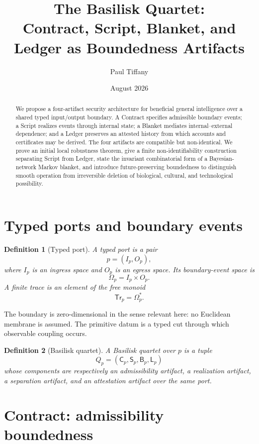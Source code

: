 \documentclass[11pt]{article}
\title{The Basilisk Quartet:\\Contract, Script, Blanket, and Ledger as Boundedness Artifacts}
\author{Paul Tiffany}
\date{August 2026}
\newtheorem{definition}{Definition}[section]
\newcommand{\Contract}{\mathsf{C}}
\newcommand{\Script}{\mathsf{S}}
\newcommand{\Blanket}{\mathsf{B}}
\newcommand{\Ledger}{\mathsf{L}}
\newcommand{\Tr}{\mathsf{Tr}}
\begin{document}
\maketitle

\begin{abstract}
We propose a four-artifact security architecture for beneficial general intelligence over a shared typed input/output boundary. A Contract specifies admissible boundary events; a Script realizes events through internal state; a Blanket mediates internal--external dependence; and a Ledger preserves an attested history from which accounts and certificates may be derived. The four artifacts are compatible but non-identical. We prove an initial local robustness theorem, give a finite non-identifiability construction separating Script from Ledger, state the invariant combinatorial form of a Bayesian-network Markov blanket, and introduce future-preserving boundedness to distinguish smooth operation from irreversible deletion of biological, cultural, and technological possibility.
\end{abstract}

\section{Typed ports and boundary events}

\begin{definition}[Typed port]
A typed port is a pair
\[
p=(I_p,O_p),
\]
where $I_p$ is an ingress space and $O_p$ is an egress space. Its boundary-event space is
\[
\Omega_p=I_p\times O_p.
\]
A finite trace is an element of the free monoid
\[
\Tr_p=\Omega_p^*.
\]
\end{definition}

The boundary is zero-dimensional in the sense relevant here: no Euclidean membrane is assumed. The primitive datum is a typed cut through which observable coupling occurs.

\begin{definition}[Basilisk quartet]
A Basilisk quartet over $p$ is a tuple
\[
Q_p=(\Contract_p,\Script_p,\Blanket_p,\Ledger_p)
\]
whose components are respectively an admissibility artifact, a realization artifact, a separation artifact, and an attestation artifact over the same port.
\end{definition}

\section{Contract: admissibility boundedness}
\end{document}

